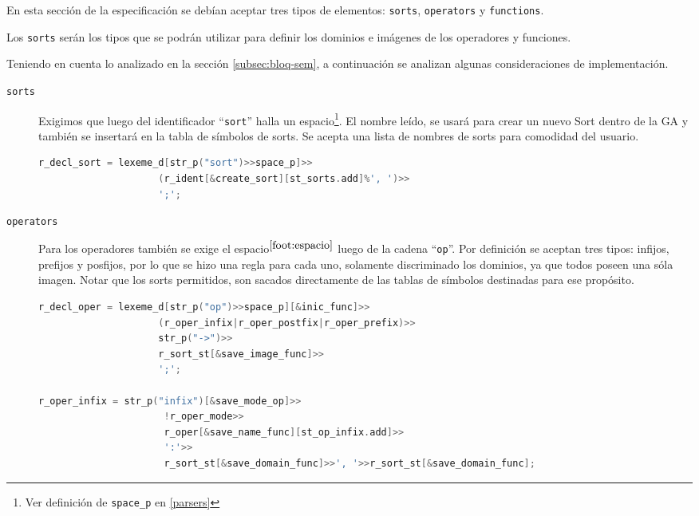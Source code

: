 En esta sección de la especificación se debían aceptar tres tipos de elementos: \texttt{sorts}, \texttt{operators} y \texttt{functions}.

Los \texttt{sorts} serán los tipos que se podrán utilizar para definir los dominios e imágenes de los operadores y funciones.

Teniendo en cuenta lo analizado en la sección \ref{subsec:bloq-sem}, a continuación se analizan algunas consideraciones de implementación.

\begin{description}
\item [\texttt{sorts}] Exigimos que luego del identificador ``\texttt{sort}'' halla un espacio\footnote{\label{foot:espacio} Ver definición de \texttt{space\_p} en \ref{parsers}}. El nombre leído, se usará para crear un nuevo Sort dentro de la GA y también se insertará en la tabla de símbolos de sorts. Se acepta una lista de nombres de sorts para comodidad del usuario.

\begin{lstlisting}[language=C++, basicstyle=\scriptsize, columns=fullflexible, linewidth=9cm]
r_decl_sort = lexeme_d[str_p("sort")>>space_p]>>
                     (r_ident[&create_sort][st_sorts.add]%', ')>>
                     ';';
\end{lstlisting}

\item [\texttt{operators}] Para los operadores también se exige el espacio$^{\ref{foot:espacio}}$ luego de la cadena ``\texttt{op}''. Por definición se aceptan tres tipos: infijos, prefijos y posfijos, por lo que se hizo una regla para cada uno, solamente discriminado los dominios, ya que todos poseen una sóla imagen. Notar que los sorts permitidos, son sacados directamente de las tablas de símbolos destinadas para ese propósito.

\begin{lstlisting}[language=C++, basicstyle=\scriptsize, columns=fullflexible, linewidth=13cm]
r_decl_oper = lexeme_d[str_p("op")>>space_p][&inic_func]>>
                     (r_oper_infix|r_oper_postfix|r_oper_prefix)>>
                     str_p("->")>>
                     r_sort_st[&save_image_func]>>
                     ';';

r_oper_infix = str_p("infix")[&save_mode_op]>>
                      !r_oper_mode>>
                      r_oper[&save_name_func][st_op_infix.add]>>
                      ':'>>
                      r_sort_st[&save_domain_func]>>', '>>r_sort_st[&save_domain_func];


\end{lstlisting}
\end{description}
